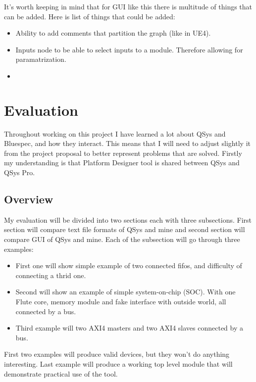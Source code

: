 \documentclass[12pt]{report}
\begin{document}
\begin{tcolorbox}[title=Futher work (TODO this can be removed)]
    It's worth keeping in mind that for GUI like this there is multitude of things that can be added. Here is list of things that could be added: 
    \begin{itemize}
        \item Ability to add comments that partition the graph (like in UE4).
        \item Inputs node to be able to select inputs to a module. Therefore allowing for paramatrization.
        \item 
    \end{itemize}
\end{tcolorbox}

\chapter{Evaluation}
Throughout working on this project I have learned a lot about QSys and Bluespec, and how they interact. This means that I will need to adjust slightly it from the project proposal to better represent problems that are solved. Firstly my understanding is that Platform Designer tool is shared between QSys and QSys Pro.

\section{Overview}
My evaluation will be divided into two sections each with three subsections. First section will compare text file formats of QSys and mine and second section will compare GUI of QSys and mine.
Each of the subsection will go through three examples:
\begin{itemize}
    \item First one will show simple example of two connected fifos, and difficulty of connecting a thrid one.
    \item Second will show an example of simple system-on-chip (SOC). With one Flute core, memory module and fake interface with outside world, all connected by a bus.
    \item Third example will two AXI4 masters and two AXI4 slaves connected by a bus. 
\end{itemize}
First two examples will produce valid devices, but they won't do anything interesting. Last example will produce a working top level module that will demonstrate practical use of the tool.
\end{document}
